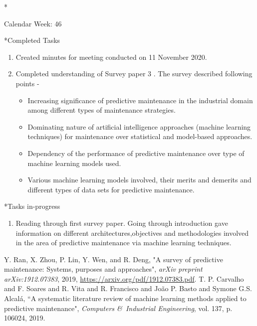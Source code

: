 \documentclass[11pt,a4paper]{article}
\begin{document}
\begin{section}*{Calendar Week: 46 \hfill \date{13 November, 2020}}

\begin{subsection}*{Completed Tasks}
    \begin{enumerate}
        \item
            Created minutes for meeting conducted on 11 November 2020. 
        \item
            Completed understanding of Survey paper 3 \cite{survey2}. The survey described following points -
            \begin{itemize}
                \item Increasing significance of predictive maintenance in the industrial domain among different types of maintenance strategies.  
                \item Dominating nature of artificial intelligence approaches (machine learning techniques) for maintenance over statistical and model-based approaches.
                \item Dependency of the performance of predictive maintenance over type of machine learning models used. 
                \item Various machine learning models involved, their merits and demerits and different types of data sets for predictive maintenance.  
            \end{itemize}
             
    \end{enumerate}
\end{subsection}
\begin{subsection}*{Tasks in-progress}
    \begin{enumerate}
        \item
            Reading through first survey paper\cite{survey1}.
            Going through introduction gave information on different architectures,objectives and methodologies involved in the area of predictive maintenance via machine learning techniques.
 
    \end{enumerate}
\end{subsection}
\begin{thebibliography}{9}
    {Y. Ran, X. Zhou, P. Lin, Y. Wen, and R. Deng},
    "A survey of predictive maintenance: Systems, purposes and approaches",
    \textit{arXiv preprint arXiv:1912.07383},
    2019,
    \href{https://arxiv.org/pdf/1912.07383.pdf}{https://arxiv.org/pdf/1912.07383.pdf}.
    {T. P. Carvalho and F. Soares and R. Vita and R. Francisco and Jo{\~a}o P. Basto and Symone G.S. Alcal{\'a}},
    “A systematic literature review of machine learning methods applied to predictive maintenance",
    \textit{Computers \&\ Industrial Engineering},
    vol. 137,
    p. 106024,
    2019.
\end{thebibliography}
\end{section}
\newpage
\end{document}
